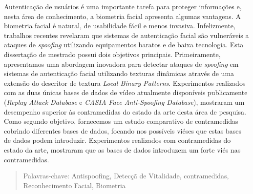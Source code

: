 Autentica\c{c}\~ao de usu\'{a}rios \'{e} uma importante tarefa para proteger informa\c{c}\~{o}es e, nesta \'area de conhecimento, a biometria facial apresenta algumas vantagens. A biometria facial \'{e} natural, de usabilidade f\'{a}cil e menos invasiva. Infelizmente, trabalhos recentes revelaram que sistemas de autentica\c{c}\~{a}o facial s\~{a}o vulner\'{a}veis a ataques de \textit{spoofing} utilizando equipamentos baratos e de baixa tecnologia. Esta disserta\c{c}\~{a}o de mestrado possui dois objetivos principais. Primeiramente, apresentamos uma abordagem inovadora para detectar ataques de \textit{spoofing} em sistemas de autentica\c{c}\~{a}o facial utilizando texturas din\^{a}micas atrav\'{e}s de uma extens\~{a}o do descritor de textura \textit{Local Binary Patterns}. Experimentos realizados com as duas \'{u}nicas bases de dados de v\'{i}deo atualmente dispon\'{i}veis publicamente (\textit{Replay Attack Database} e \textit{CASIA Face Anti-Spoofing Database}), mostraram um desempenho superior \`{a}s contramedidas do estado da arte desta \'{a}rea de pesquisa. Como segundo objetivo, fornecemos um estudo comparativo de contramedidas cobrindo diferentes bases de dados, focando nos poss\'{i}veis vi\'{e}ses que estas bases de dados podem introduzir. Experimentos realizados com contramedidas do estado da arte, mostraram que as bases de dados introduzem um forte vi\'{e}s nas contramedidas.


\begin{quotation}
\noindent 

\vspace*{0.5cm}

\noindent Palavras-chave: Antispoofing, Detec\c{c}\~{a} de Vitalidade, contramedidas, Reconhecimento Facial, Biometria
\end{quotation}


\newpage
\null

